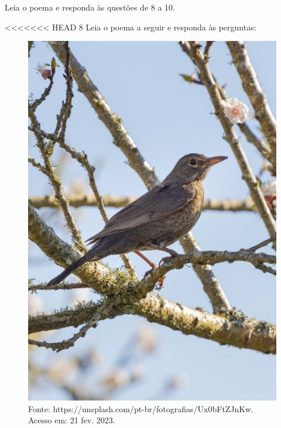 
\pagebreak
Leia o poema e responda às questões de 8 a 10.

<<<<<<< HEAD
\num{8} Leia o poema a seguir e responda às perguntas:

\begin{figure}[htpb!]
\includegraphics[width=.5\textwidth]{./imgs/img17.jpg}
\caption{Fonte: https://unsplash.com/pt-br/fotografias/Ux0bFtZJnKw. Acesso em: 21 fev. 2023.}
\end{figure}

